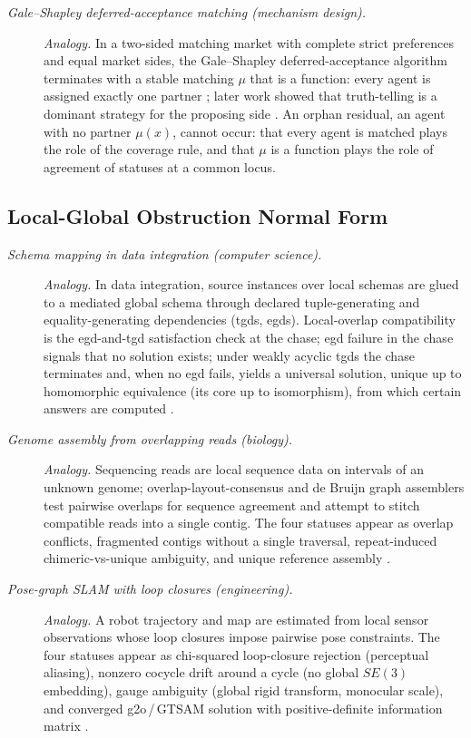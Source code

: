 \begin{description}
\item[\emph{Gale--Shapley deferred-acceptance matching
(mechanism design).}] \textit{Analogy.}
In a two-sided matching market with complete strict preferences and
equal market sides, the Gale--Shapley deferred-acceptance algorithm
terminates with a stable matching \(\mu\) that is a function: every agent is assigned exactly one partner
\citep{GaleShapley1962CollegeAdmissions}; later work showed that
truth-telling is a dominant strategy for the proposing side
\citep{DubinsFreedman1981Machiavelli,Roth1982EconomicsMatching}.  An
orphan residual, an agent with no partner \(\mu(x)\), cannot occur: that
every agent is matched plays the role of the  coverage rule,
and that \(\mu\) is a function plays the role of agreement of statuses
at a common locus.
\end{description}
\endgroup

\subsection*{ Local-Global Obstruction Normal Form}
\begingroup\small
\begin{description}
\item[\emph{Schema mapping in data integration (computer science).}] \textit{Analogy.}
In data integration, source instances over local schemas are
glued to a mediated global schema through declared
tuple-generating and equality-generating dependencies (tgds, egds).
Local-overlap compatibility is the egd-and-tgd satisfaction check
at the chase; egd failure in the chase signals that no solution exists; under weakly acyclic tgds the chase terminates and, when no egd fails, yields a universal solution, unique up to homomorphic equivalence (its core up to isomorphism), from which certain answers are computed \citep{Fagin2005DataExchange}.

\item[\emph{Genome assembly from overlapping reads (biology).}] \textit{Analogy.}
Sequencing reads are local sequence data on intervals of an
unknown genome; overlap-layout-consensus and de Bruijn graph
assemblers test pairwise overlaps for sequence agreement and
attempt to stitch compatible reads into a single contig.  The
four statuses appear as overlap conflicts, fragmented contigs
without a single traversal, repeat-induced chimeric-vs-unique
ambiguity, and unique reference assembly
\citep{PevznerTangWaterman2001Eulerian}.

\item[\emph{Pose-graph SLAM with loop closures (engineering).}] \textit{Analogy.}
A robot trajectory and map are estimated from local sensor
observations whose loop closures impose pairwise pose constraints.
The four statuses appear as chi-squared loop-closure rejection
(perceptual aliasing), nonzero cocycle drift around a cycle (no
global \(SE(3)\) embedding), gauge ambiguity (global rigid
transform, monocular scale), and converged g2o\,/\,GTSAM solution
with positive-definite information matrix
\citep{Cadena2016SLAMSurvey}.
\end{description}
\endgroup

